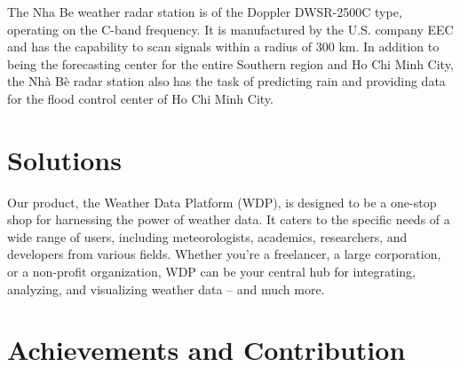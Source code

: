 The Nha Be weather radar station is of the Doppler DWSR-2500C type, operating on
the C-band frequency. It is manufactured by the U.S. company EEC and has the
capability to scan signals within a radius of 300 km. In addition to being the
forecasting center for the entire Southern region and Ho Chi Minh City, the Nhà
Bè radar station also has the task of predicting rain and providing data for the
flood control center of Ho Chi Minh City.


\section{Solutions}

Our product, the Weather Data Platform (WDP), is designed to be a one-stop shop
for harnessing the power of weather data. It caters to the specific needs of a
wide range of users, including meteorologists, academics, researchers, and
developers from various fields. Whether you're a freelancer, a large
corporation, or a non-profit organization, WDP can be your central hub for
integrating, analyzing, and visualizing weather data – and much more.

\section{Achievements and Contribution}